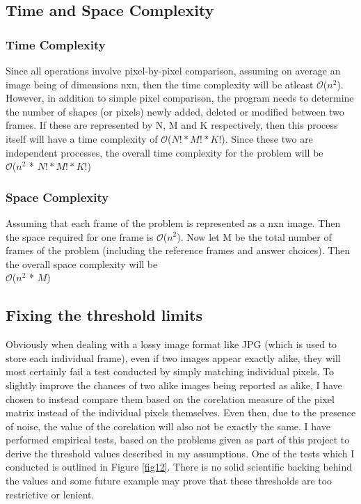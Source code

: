 \documentclass[10pt, letter]{article}
\newcommand{\bigO}{\ensuremath{\mathcal{O}}}
\begin{document}
\subsection*{Time and Space Complexity}
\subsubsection*{Time Complexity}
Since all operations involve pixel-by-pixel comparison, assuming on average an image being of dimensions nxn, then the time complexity will be atleast \bigO{($n^2$)}. However, in addition to simple pixel comparison, the program needs to determine the number of shapes (or pixels) newly added, deleted or modified between two frames. If these are represented by N, M and K respectively, then this process itself will have a time complexity of \bigO{($N! * M! * K!$)}. Since these two are independent processes, the overall time complexity for the problem will be \\
\hspace*{3cm}\bigO{($n^2$ * $N! * M! * K!$)}
\subsubsection*{Space Complexity}
Assuming that each frame of the problem is represented as a nxn image. Then the space required for one frame is \bigO{($n^2$)}. Now let M be the total number of frames of the problem (including the reference frames and answer choices). Then the overall space complexity will be \\
\hspace*{3cm}\bigO{($n^2$ * $M$)}

\subsection*{Fixing the threshold limits}
Obviously when dealing with a lossy image format like JPG (which is used to store each individual frame), even if two images appear exactly alike, they will most certainly fail a test conducted by simply matching individual pixels. To slightly improve the chances of two alike images being reported as alike, I have chosen to instead compare them based on the corelation measure of the pixel matrix instead of the individual pixels themselves. Even then, due to the presence of noise, the value of the corelation will also not be exactly the same. I have performed empirical tests, based on the problems given as part of this project to derive the threshold values described in my assumptions. One of the tests which I conducted is outlined in Figure \ref{fig12}. There is no solid scientific backing behind the values and some future example may prove that these thresholds are too restrictive or lenient.
\end{document}
